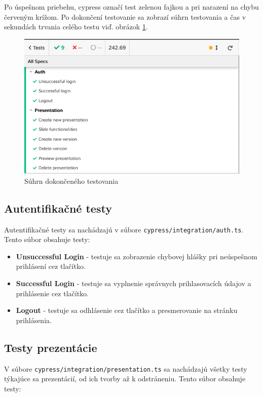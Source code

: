 Po úspešnom priebehu, cypress označí test zelenou fajkou a pri narazení na chybu červeným krížom. Po dokončení testovanie sa zobrazí súhrn testovania a čas v sekundách trvania celého testu viď. obrázok \ref{pic:cypress}.

    \begin{figure}[!hbt]
        \centering
        \includegraphics[scale=0.4]{obrazky/cypress.png}
        \caption{Súhrn dokončeného testovania}
        \label{pic:cypress}
    \end{figure}

\subsection*{Autentifikačné testy}
Autentifikačné testy sa nachádzajú v súbore \texttt{cypress/integration/auth.ts}. Tento súbor obsahuje testy:

    \begin{itemize}
        \item\textbf{Unsuccessful Login} - testuje sa zobrazenie chybovej hlášky pri neúspešnom prihlásení cez tlačítko.    
        \item\textbf{Successful Login} - testuje sa vyplnenie správnych prihlasovacích údajov a prihlásenie cez tlačítko.
        \item\textbf{Logout} - testuje sa odhlásenie cez tlačítko a presmerovanie na stránku prihlásenia.
    \end{itemize}
    
\subsection*{Testy prezentácie}
V súbore \texttt{cypress/integration/presentation.ts} sa nachádzajú všetky testy týkajúce sa prezentácií, od ich tvorby až k odstráneniu. Tento súbor obsahuje testy:

